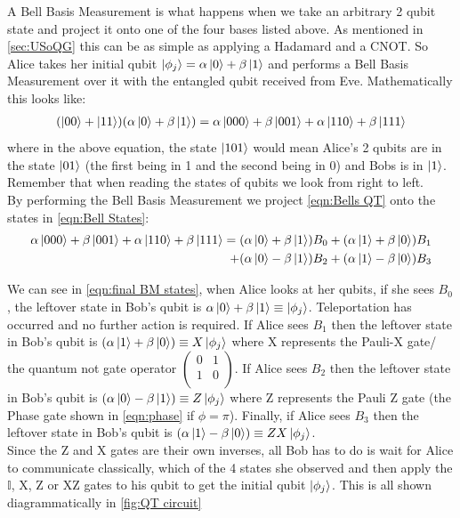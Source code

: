 A Bell Basis Measurement is what happens when we take an arbitrary 2 qubit state and project it onto one of the four bases listed above. As mentioned in \ref{sec:USoQG} this can be as simple as applying a Hadamard and a CNOT. So Alice takes her initial qubit $\ket{\phi_j} = \alpha\ket{0} + \beta\ket{1}$ and performs a Bell Basis Measurement over it with the entangled qubit received from Eve. Mathematically this looks like:
\begin{align} \label{eqn:Bells QT}
    (\ket{00} + \ket{11})(\alpha\ket{0} + \beta\ket{1}) = \alpha\ket{000} + \beta\ket{001} + \alpha\ket{110} + \beta\ket{111}
\end{align}
where in the above equation, the state $\ket{101}$ would mean Alice's 2 qubits are in the state $\ket{01}$ (the first being in 1 and the second being in 0) and Bobs is in $\ket{1}$. Remember that when reading the states of qubits we look from right to left. 
\\
By performing the Bell Basis Measurement we project \ref{eqn:Bells QT} onto the states in \ref{eqn:Bell States}:
\begin{align}\label{eqn:final BM states}
    \alpha\ket{000} + \beta\ket{001} + \alpha\ket{110} + \beta\ket{111} = (\alpha\ket{0} + \beta\ket{1})B_0 + (\alpha\ket{1} + \beta\ket{0})B_1 \\ +(\alpha\ket{0} - \beta\ket{1})B_2 + (\alpha\ket{1} - \beta\ket{0})B_3 
\end{align}

We can see in \ref{eqn:final BM states}, when Alice looks at her qubits, if she sees $B_0$, the leftover state in Bob's qubit is $\alpha\ket{0} + \beta\ket{1} \equiv \ket{\phi_j}$. Teleportation has occurred and no further action is required. If Alice sees $B_1$ then the leftover state in Bob's qubit is $(\alpha\ket{1} + \beta\ket{0}) \equiv X\ket{\phi_j}$ where X represents the Pauli-X gate/ the quantum not gate operator $
\begin{pmatrix}
    0 & 1\\
    1 & 0\\
\end{pmatrix}$. If Alice sees $B_2$ then the leftover state in Bob's qubit is $(\alpha\ket{0} - \beta\ket{1}) \equiv Z\ket{\phi_j}$ where Z represents the Pauli Z gate (the Phase gate shown in \ref{eqn:phase} if $\phi = \pi$). Finally, if Alice sees $B_3$ then the leftover state in Bob's qubit is $(\alpha\ket{1} - \beta\ket{0}) \equiv ZX\ket{\phi_j}$. 
\\
Since the Z and X gates are their own inverses, all Bob has to do is wait for Alice to communicate classically, which of the 4 states she observed and then apply the $\mathbb{I}$, X, Z or XZ gates to his qubit to get the initial qubit $\ket{\phi_j}$. This is all shown diagrammatically in \ref{fig:QT circuit}

